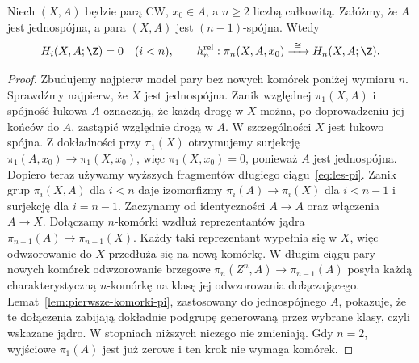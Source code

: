 \begin{twierdzenie}
\label{thm:hurewicz-wzgledny}
Niech $(X,A)$ będzie parą CW,
$x_0\in A$, a $n\geq2$ liczbą całkowitą.
Załóżmy, że $A$ jest jednospójna,
a para $(X,A)$ jest $(n-1)$-spójna. Wtedy
\[
 H_i(X,A;\Z)=0\quad(i<n),
 \qquad
 h_n^{\mathrm{rel}}:
 \pi_n(X,A,x_0)
 \xrightarrow{\ \cong\ }
 H_n(X,A;\Z).
\]
\end{twierdzenie}
\begin{proof}
Zbudujemy najpierw
model pary bez nowych
komórek poniżej
wymiaru $n$.
Sprawdźmy najpierw, że $X$ jest jednospójna.
Zanik względnej $\pi_1(X,A)$ i spójność łukowa $A$
oznaczają, że każdą drogę w $X$ można, po doprowadzeniu
jej końców do $A$, zastąpić względnie drogą w $A$.
W szczególności $X$ jest łukowo spójna.
Z dokładności przy $\pi_1(X)$ otrzymujemy
surjekcję $\pi_1(A,x_0)\to\pi_1(X,x_0)$,
więc $\pi_1(X,x_0)=0$, ponieważ $A$ jest jednospójna.
Dopiero teraz używamy wyższych fragmentów
długiego ciągu~\eqref{eq:les-pi}.
Zanik grup $\pi_i(X,A)$ dla $i<n$
daje izomorfizmy
$\pi_i(A)\to\pi_i(X)$
dla $i<n-1$ i
surjekcję dla
$i=n-1$.
Zaczynamy od
identyczności $A\to A$
oraz włączenia $A\to X$.
Dołączamy $n$-komórki
wzdłuż reprezentantów
jądra
$\pi_{n-1}(A)\to
\pi_{n-1}(X)$.
Każdy taki reprezentant
wypełnia się w $X$,
więc odwzorowanie do $X$
przedłuża się na
nową komórkę.
W długim ciągu
pary nowych komórek
odwzorowanie brzegowe
$\pi_n(Z^n,A)\to
\pi_{n-1}(A)$
posyła każdą
charakterystyczną
$n$-komórkę na
klasę jej odwzorowania
dołączającego.
Lemat~\ref{lem:pierwsze-komorki-pi},
zastosowany do
jednospójnego $A$,
pokazuje, że
te dołączenia
zabijają dokładnie
podgrupę generowaną
przez wybrane klasy,
czyli wskazane jądro.
W stopniach
niższych niczego
nie zmieniają.
Gdy $n=2$,
wyjściowe $\pi_1(A)$
jest już zerowe
i ten krok nie
wymaga komórek.


\end{proof}
